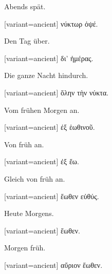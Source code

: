 Abends spät.

\switchcolumn

\begin{greek}[variant=ancient]%
νύκτωρ ὀψέ.

\end{greek}%
\switchcolumn*

Den Tag über.

\switchcolumn

\begin{greek}[variant=ancient]%
δι' ἡμέρας.

\end{greek}%
\switchcolumn*

Die ganze Nacht hindurch.

\switchcolumn

\begin{greek}[variant=ancient]%
ὅλην τὴν νύκτα.

\end{greek}%
\switchcolumn*

Vom frühen Morgen an.

\switchcolumn

\begin{greek}[variant=ancient]%
ἐξ ἑωθινοῦ.

\end{greek}%
\switchcolumn*

Von früh an.

\switchcolumn

\begin{greek}[variant=ancient]%
ἐξ ἕω.

\end{greek}%
\switchcolumn*

Gleich von früh an.

\switchcolumn

\begin{greek}[variant=ancient]%
ἕωθεν εὐθύς.

\end{greek}%
\switchcolumn*

Heute Morgens.

\switchcolumn

\begin{greek}[variant=ancient]%
ἕωθεν.

\end{greek}%
\switchcolumn*

Morgen früh.

\switchcolumn

\begin{greek}[variant=ancient]%
αὔριον ἕωθεν.

\end{greek}%
\switchcolumn*

